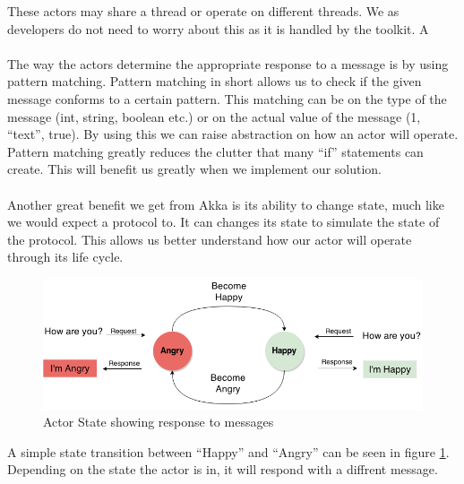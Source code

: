 These actors may share a thread or operate on different threads. We as developers do not need to worry about this as it is handled by the toolkit. A
\\\\
The way the actors determine the appropriate response to a message is by using pattern matching. Pattern matching in short allows us to check if the given message conforms to a certain pattern. This matching can be on the type of the message (int, string, boolean etc.) or on the actual value of the message (1, “text”, true). By using this we can raise abstraction on how an actor will operate. Pattern matching greatly reduces the clutter that many ``if'' statements can create. This will benefit us greatly when we implement our solution. 
\\\\
Another great benefit we get from Akka is its ability to change state, much like we would expect a protocol to. It can changes its state to simulate the state of the protocol. This allows us better understand how our actor will operate through its life cycle.
\begin{figure}[h]
	\centering
	\includegraphics[scale=0.45]{images/tools/ActorState.png} 
	\caption{Actor State showing response to messages}
	\label{fig:ActorState}
\end{figure}
A simple state transition between ``Happy'' and ``Angry'' can be seen in figure \ref{fig:ActorState}. Depending on the state the actor is in, it will respond with a diffrent message.


